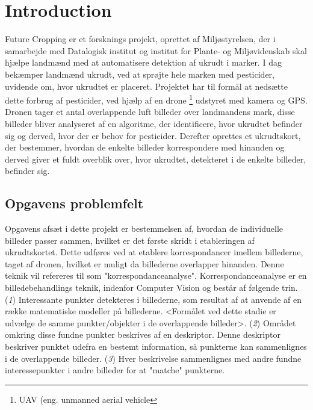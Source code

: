 \chapter{Introduction} \label{sec:intro}
Future Cropping er et forsknings projekt, oprettet af Miljøstyrelsen, der i samarbejde med Datalogisk institut og institut for Plante- og Miljøvidenskab skal hjælpe landmænd med at automatisere detektion af ukrudt i marker. I dag bekæmper landmænd ukrudt, ved at sprøjte hele marken med pesticider, uvidende om, hvor ukrudtet er placeret. Projektet har til formål at nedsætte dette forbrug af pesticider, ved hjælp af en drone \footnote{UAV (eng. unmanned aerial vehicle} udstyret med kamera og GPS. Dronen tager et antal overlappende luft billeder over landmandens mark, disse billeder bliver analyseret af en algoritme, der identificere, hvor ukrudtet befinder sig og derved, hvor der er behov for pesticider. Derefter oprettes et ukrudtskort, der bestemmer, hvordan de enkelte billeder korrespondere med hinanden og derved giver et fuldt overblik over, hvor ukrudtet, detekteret i de enkelte billeder, befinder sig\cite{drone}.
\section{Opgavens problemfelt} \label{subsec:felt}
Opgavens afsæt i dette projekt er bestemmelsen af, hvordan de individuelle billeder passer sammen, hvilket er det første skridt i etableringen af ukrudtskortet. Dette udføres ved at etablere korrespondancer imellem billederne, taget af dronen, hvilket er muligt da billederne overlapper hinanden. Denne teknik vil refereres til som "korrespondanceanalyse". Korrespondanceanalyse er en billedebehandlings teknik, indenfor Computer Vision og består af følgende trin. (\textit{1}) Interessante punkter detekteres i billederne, som resultat af at anvende af en række matematiske modeller på billederne. <Formålet ved dette stadie er udvælge de samme punkter/objekter i de overlappende billeder>. (\textit{2}) Området omkring disse fundne punkter beskrives af en deskriptor. Denne deskriptor beskriver punktet udefra en bestemt information, så punkterne kan sammenlignes i de overlappende billeder. (\textit{3}) Hver beskrivelse sammenlignes med andre fundne interessepunkter i andre billeder for at "matche" punkterne.
